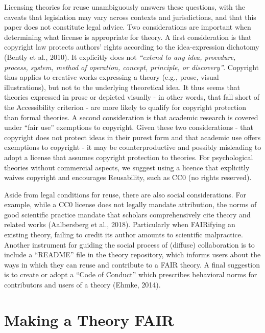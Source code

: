 \documentclass[
  man, noextraspace,floatsintext]{apa7}
\begin{document}
Licensing theories for reuse unambiguously answers these questions,
with the caveats that legislation may vary across contexts and jurisdictions, and that this paper does not constitute legal advice.
Two considerations are important when determining what license is appropriate for theory.
A first consideration is that copyright law protects authors' rights according to the idea-expression dichotomy (Bently et al., 2010).
It explicitly does not
\emph{``extend to any idea, procedure, process, system, method of operation, concept, principle, or discovery''}.
Copyright thus applies to creative works expressing a theory (e.g., prose, visual illustrations),
but not to the underlying theoretical idea.
It thus seems that theories expressed in prose or depicted visually - in other words, that fall short of the Accessibility criterion - are more likely to qualify for copyright protection than formal theories.
A second consideration is that academic research is covered under ``fair use'' exemptions to copyright.
Given these two considerations - that copyright does not protect ideas in their purest form and that academic use offers exemptions to copyright - it may be counterproductive and possibly misleading to adopt a license that assumes copyright protection to theories.
For psychological theories without commercial aspects, we suggest using a licence that explicitly waives copyright and encourages Reusability,
such as CC0 (no rights reserved).

Aside from legal conditions for reuse, there are also social considerations.
For example, while a CC0 license does not legally mandate attribution,
the norms of good scientific practice mandate that scholars comprehensively cite theory and related works (Aalbersberg et al., 2018).
Particularly when FAIRifying an existing theory, failing to credit its author amounts to scientific malpractice.
Another instrument for guiding the social process of (diffuse) collaboration is to include a ``README'' file in the theory repository, which informs users about the ways in which they can reuse and contribute to a FAIR theory.
A final suggestion is to create or adopt a ``Code of Conduct'' which prescribes behavioral norms for contributors and users of a theory (Ehmke, 2014).

\section{Making a Theory FAIR}\label{making-a-theory-fair}
\end{document}

